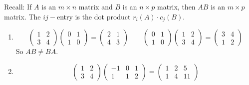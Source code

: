 \documentclass[10pt]{scrartcl}
\begin{document}
Recall: If $A$ is an $m \times n$ matrix  and $B$ is an $ n \times p$ matrix, then $AB$ is an $m \times p$ matrix. The $ij-$entry is the dot product $r_i(A)\cdot c_j(B)$.\\

\begin{examples}
\begin{enumerate}
\item \[
  \begin{pmatrix}
  1 & 2 \\ 3 & 4	
  \end{pmatrix}\begin{pmatrix}
0 & 1 \\ 1 & 0	
\end{pmatrix} = \begin{pmatrix}
 2 & 1 \\ 4 & 3	
 \end{pmatrix}
\qquad 
\begin{pmatrix}
0 & 1 \\ 1 & 0	
\end{pmatrix}\begin{pmatrix}
1 & 2 \\ 3 & 4	
\end{pmatrix} = \begin{pmatrix}
 3 & 4 \\ 1 & 2	
 \end{pmatrix}
\]
So $AB \neq BA$. 

\item 
\[
  \begin{pmatrix}
  1 & 2 \\ 3 & 4	
  \end{pmatrix}\begin{pmatrix}
 - 1& 0 & 1 \\ 1 & 1 & 2	
\end{pmatrix} = \begin{pmatrix}
 1 & 2 & 5\\ 1 & 4 & 11	
 \end{pmatrix}
\]


\end{enumerate}
\end{examples}
\end{document}
